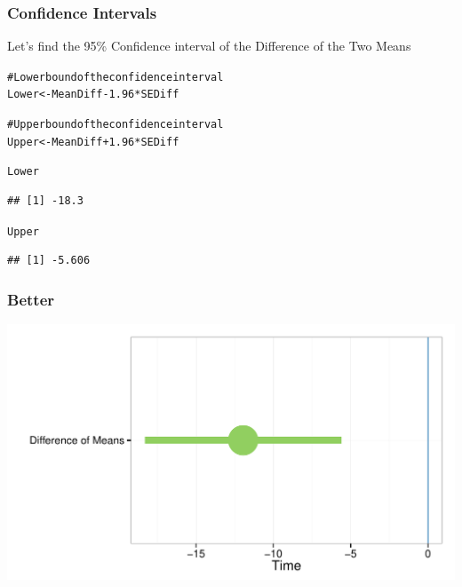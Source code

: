 \documentclass{beamer}\usepackage{graphicx, color}
\makeatletter
\def\maxwidth{ %
  \ifdim\Gin@nat@width>\linewidth
    \linewidth
  \else
    \Gin@nat@width
  \fi
}
\newcommand{\hlcomment}[1]{\textcolor[rgb]{0.180392156862745,0.6,0.341176470588235}{#1}}%
\newenvironment{kframe}{%
 \def\at@end@of@kframe{}%
 \ifinner\ifhmode%
  \def\at@end@of@kframe{\end{minipage}}%
  \begin{minipage}{\columnwidth}%
 \fi\fi%
 \def\FrameCommand##1{\hskip\@totalleftmargin \hskip-\fboxsep
 \colorbox{shadecolor}{##1}\hskip-\fboxsep
     \hskip-\linewidth \hskip-\@totalleftmargin \hskip\columnwidth}%
 \MakeFramed {\advance\hsize-\width
   \@totalleftmargin\z@ \linewidth\hsize
   \@setminipage}}%
 {\par\unskip\endMakeFramed%
 \at@end@of@kframe}
\newenvironment{knitrout}{}{} %
\makeatother
\begin{document}
\begin{frame}[fragile]
  \frametitle{Confidence Intervals}
{\Large{Let's find the 95\% Confidence interval of the Difference of the Two Means}}
\begin{knitrout}
\color{fgcolor}\begin{kframe}
\begin{alltt}
\hlcomment{# Lower bound of the confidence interval}
Lower <- MeanDiff - 1.96 * SEDiff

\hlcomment{# Upper bound of the confidence interval}
Upper <- MeanDiff + 1.96 * SEDiff

Lower
\end{alltt}
\begin{verbatim}
## [1] -18.3
\end{verbatim}
\begin{alltt}
Upper
\end{alltt}
\begin{verbatim}
## [1] -5.606
\end{verbatim}
\end{kframe}
\end{knitrout}

\end{frame}

\begin{frame}[fragile]
  \frametitle{Better}
\begin{knitrout}
\color{fgcolor}

{\centering \includegraphics[width=\maxwidth]{figure/PlotCIDiffMeans} 

}


\end{knitrout}

\end{frame}
\end{document}
